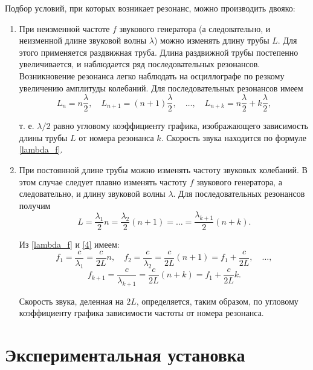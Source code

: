 \documentclass[a4paper,12pt]{article} %
\begin{document}
\noindent Подбор условий, при которых возникает резонанс, можно производить двояко:
\begin{enumerate}

 \item При неизменной частоте $ f $ звукового генератора (а следовательно, и неизменной длине звуковой волны $ \lambda $) можно изменять длину трубы $ L $. Для этого применяется раздвижная труба. Длина раздвижной трубы постепенно увеличивается, и наблюдается ряд последовательных резонансов. Возникновение резонанса легко наблюдать на осциллографе по резкому увеличению амплитуды колебаний. Для последовательных резонансов имеем \begin{equation}
	\label{first}
	L_n=n\frac{\lambda}{2}, \quad L_{n+1}=(n+1)\frac{\lambda}{2}, \quad \dots, \quad L_{n+k} = n\frac{\lambda}{2}+k\frac{\lambda}{2},
	\end{equation} 
	
\noindent т. е. $ \lambda/2 $ равно угловому коэффициенту графика, изображающего зависимость длины трубы $ L $ от номера резонанса $ k $. Скорость звука находится по формуле \eqref{lambda_f}.

 \item При постоянной длине трубы можно изменять частоту звуковых колебаний. В этом случае следует плавно изменять частоту $ f $ звукового генератора, а следовательно, и длину звуковой волны $ \lambda $. Для последовательных резонансов получим 
	\begin{equation}\label{4}
	L=\frac{\lambda_1}{2}n=\frac{\lambda_2}{2}(n+1)=\dots=\frac{\lambda_{k+1}}{2}(n+k).
	\end{equation}
	
\noindent Из \eqref{lambda_f} и \eqref{4} имеем:
	\[ f_1=\frac{c}{\lambda_1}=\frac{c}{2L}n, \quad f_2=\frac{c}{\lambda_2}=\frac{c}{2L}(n+1)=f_1+\frac{c}{2L},\quad \dots, \]
	\begin{equation}\label{5}
	f_{k+1}=\frac{c}{\lambda_{k+1}}=\frac{c}{2L}(n+k)=f_1+\frac{c}{2L}k.
	\end{equation}
	
	\medskip
	
\noindent Скорость звука, деленная на $ 2L $, определяется, таким образом, по угловому коэффициенту графика зависимости частоты от номера резонанса.
\end{enumerate}


\section{Экспериментальная установка}
\end{document}
